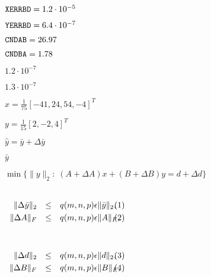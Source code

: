 {\newpage\clearpage
{}%
${\tt XERRBD} = 1.2\cdot10^{-5}$%
\lthtmlinlinemathZ
\lthtmlcheckvsize\clearpage}

{\newpage\clearpage
{}%
${\tt YERRBD} = 6.4\cdot10^{-7}$%
\lthtmlinlinemathZ
\lthtmlcheckvsize\clearpage}

{\newpage\clearpage
{}%
${\tt CNDAB} = 26.97$%
\lthtmlinlinemathZ
\lthtmlcheckvsize\clearpage}

{\newpage\clearpage
{}%
${\tt CNDBA} = 1.78$%
\lthtmlinlinemathZ
\lthtmlcheckvsize\clearpage}

{\newpage\clearpage
{}%
$1.2\cdot10^{-7}$%
\lthtmlinlinemathZ
\lthtmlcheckvsize\clearpage}

{\newpage\clearpage
{}%
$1.3\cdot10^{-7}$%
\lthtmlinlinemathZ
\lthtmlcheckvsize\clearpage}

{\newpage\clearpage
{}%
$x = \frac{1}{75}[-41,24,54,-4]^T$%
\lthtmlinlinemathZ
\lthtmlcheckvsize\clearpage}

{\newpage\clearpage
{}%
$y = \frac{1}{15}[2,-2,4]^T$%
\lthtmlinlinemathZ
\lthtmlcheckvsize\clearpage}

{\newpage\clearpage
{}%
$\widehat {y} = \bar {y} + \Delta \bar {y}$%
\lthtmlinlinemathZ
\lthtmlcheckvsize\clearpage}

{\newpage\clearpage
{}%
$\bar {y}$%
\lthtmlinlinemathZ
\lthtmlcheckvsize\clearpage}

{\newpage\clearpage
{}%
$\min\{\| y \|_2: \; (A + \Delta A)x + (B + \Delta B)y= d + \Delta d \} $%
\lthtmlinlinemathZ
\lthtmlcheckvsize\clearpage}

{\newpage\clearpage
{}%
$\textstyle \parbox{2in}{
  \begin{eqnarray*}
  \| \Delta \bar {y} \|_2 & \leq & q(m,n,p)\epsilon\|\bar {y}\|_2, \\
  \| \Delta A \|_F & \leq & q(m,n,p)\epsilon\|A\|_F,
  \end{eqnarray*} }$%
\lthtmlinlinemathZ
\lthtmlcheckvsize\clearpage}

{\newpage\clearpage
{}%
$\textstyle \parbox{2in}{
  \begin{eqnarray*}
  \| \Delta d \|_2 & \leq & q(m,n,p)\epsilon\|d\|_2, \\
  \| \Delta B \|_F & \leq & q(m,n,p)\epsilon\|B\|_F,
  \end{eqnarray*}
}$%
\lthtmlinlinemathZ
\lthtmlcheckvsize\clearpage}

